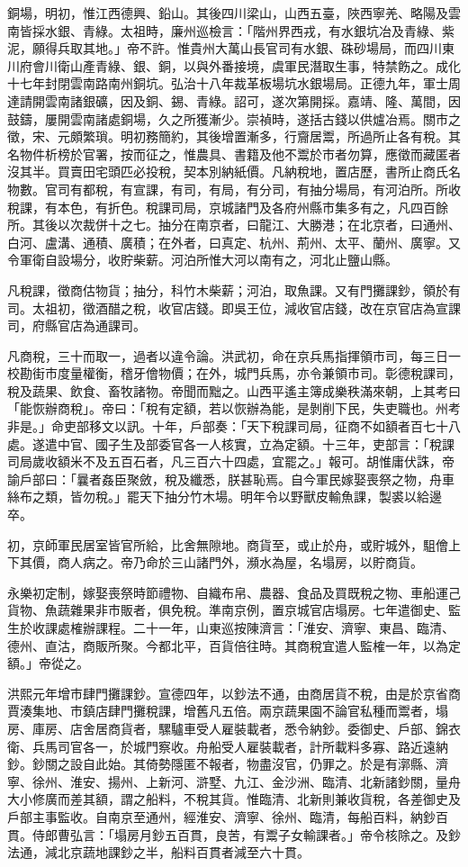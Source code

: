銅場，明初，惟江西德興、鉛山。其後四川梁山，山西五臺，陜西寧羌、略陽及雲南皆採水銀、青綠。太祖時，廉州巡檢言：「階州界西戎，有水銀坑冶及青綠、紫泥，願得兵取其地。」帝不許。惟貴州大萬山長官司有水銀、硃砂場局，而四川東川府會川衛山產青綠、銀、銅，以與外番接境，虞軍民潛取生事，特禁飭之。成化十七年封閉雲南路南州銅坑。弘治十八年裁革板場坑水銀場局。正德九年，軍士周達請開雲南諸銀礦，因及銅、錫、青綠。詔可，遂次第開採。嘉靖、隆、萬間，因鼓鑄，屢開雲南諸處銅場，久之所獲漸少。崇禎時，遂括古錢以供爐冶焉。關市之徵，宋、元頗繁瑣。明初務簡約，其後增置漸多，行齎居鬻，所過所止各有稅。其名物件析榜於官署，按而征之，惟農具、書籍及他不鬻於市者勿算，應徵而藏匿者沒其半。買賣田宅頭匹必投稅，契本別納紙價。凡納稅地，置店歷，書所止商氏名物數。官司有都稅，有宣課，有司，有局，有分司，有抽分場局，有河泊所。所收稅課，有本色，有折色。稅課司局，京城諸門及各府州縣市集多有之，凡四百餘所。其後以次裁併十之七。抽分在南京者，曰龍江、大勝港；在北京者，曰通州、白河、盧溝、通積、廣積；在外者，曰真定、杭州、荊州、太平、蘭州、廣寧。又令軍衛自設場分，收貯柴薪。河泊所惟大河以南有之，河北止鹽山縣。

凡稅課，徵商估物貨；抽分，科竹木柴薪；河泊，取魚課。又有門攤課鈔，領於有司。太祖初，徵酒醋之稅，收官店錢。即吳王位，減收官店錢，改在京官店為宣課司，府縣官店為通課司。

凡商稅，三十而取一，過者以違令論。洪武初，命在京兵馬指揮領市司，每三日一校勘街市度量權衡，稽牙儈物價；在外，城門兵馬，亦令兼領市司。彰德稅課司，稅及蔬果、飲食、畜牧諸物。帝聞而黜之。山西平遙主簿成樂秩滿來朝，上其考曰「能恢辦商稅」。帝曰：「稅有定額，若以恢辦為能，是剝削下民，失吏職也。州考非是。」命吏部移文以訊。十年，戶部奏：「天下稅課司局，征商不如額者百七十八處。遂遣中官、國子生及部委官各一人核實，立為定額。十三年，吏部言：「稅課司局歲收額米不及五百石者，凡三百六十四處，宜罷之。」報可。胡惟庸伏誅，帝諭戶部曰：「曩者姦臣聚斂，稅及纖悉，朕甚恥焉。自今軍民嫁娶喪祭之物，舟車絲布之類，皆勿稅。」罷天下抽分竹木場。明年令以野獸皮輸魚課，製裘以給邊卒。

初，京師軍民居室皆官所給，比舍無隙地。商貨至，或止於舟，或貯城外，駔儈上下其價，商人病之。帝乃命於三山諸門外，瀕水為屋，名塌房，以貯商貨。

永樂初定制，嫁娶喪祭時節禮物、自織布帛、農器、食品及買既稅之物、車船運己貨物、魚蔬雜果非市販者，俱免稅。準南京例，置京城官店塌房。七年遣御史、監生於收課處榷辦課程。二十一年，山東巡按陳濟言：「淮安、濟寧、東昌、臨清、德州、直沽，商販所聚。今都北平，百貨倍往時。其商稅宜遣人監榷一年，以為定額。」帝從之。

洪熙元年增市肆門攤課鈔。宣德四年，以鈔法不通，由商居貨不稅，由是於京省商賈湊集地、市鎮店肆門攤稅課，增舊凡五倍。兩京蔬果園不論官私種而鬻者，塌房、庫房、店舍居商貨者，騾驢車受人雇裝載者，悉令納鈔。委御史、戶部、錦衣衛、兵馬司官各一，於城門察收。舟船受人雇裝載者，計所載料多寡、路近遠納鈔。鈔關之設自此始。其倚勢隱匿不報者，物盡沒官，仍罪之。於是有漷縣、濟寧、徐州、淮安、揚州、上新河、滸墅、九江、金沙洲、臨清、北新諸鈔關，量舟大小修廣而差其額，謂之船料，不稅其貨。惟臨清、北新則兼收貨稅，各差御史及戶部主事監收。自南京至通州，經淮安、濟寧、徐州、臨清，每船百料，納鈔百貫。侍郎曹弘言：「塌房月鈔五百貫，良苦，有鬻子女輸課者。」帝令核除之。及鈔法通，減北京蔬地課鈔之半，船料百貫者減至六十貫。

